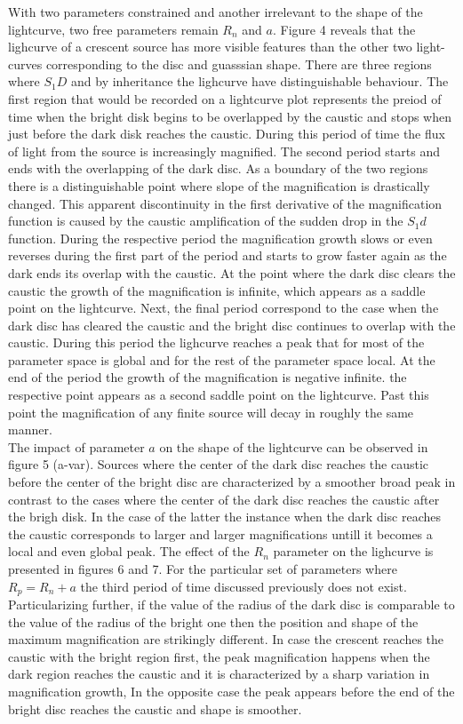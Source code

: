 With two parameters constrained and another irrelevant to the shape of the lightcurve, two free parameters remain $R_n$ and $a$. Figure 4 reveals that the lighcurve of a crescent source has more visible features than the other two light-curves corresponding to the disc and guasssian shape. There are three regions where $S_1D$ and by inheritance the lighcurve have distinguishable behaviour. The first region that would be recorded on a lightcurve plot represents the preiod of time when the bright disk begins to be overlapped by the caustic and stops when just before the dark disk reaches the caustic. During this period of time the flux of light from the source is increasingly magnified. The second period starts and ends with the overlapping of the dark disc. As a boundary of the two regions there is a distinguishable point where slope of the magnification is drastically changed. This apparent discontinuity in the first derivative of the magnification function is caused by the caustic amplification of the sudden drop in the $S_1d$ function. During the respective period the magnification growth slows or even reverses during the first part of the period and starts to grow faster again as the dark ends its overlap with the caustic. At the point where the dark disc clears the caustic the growth of the magnification is infinite, which appears as a saddle point on the lightcurve. Next, the final period correspond to the case when the dark disc has cleared the caustic and the bright disc continues to overlap with the caustic. During this period the lighcurve reaches a peak that for most of the parameter space is global and for the rest of the parameter space local. At the end of the period the growth of the magnification is negative infinite. the respective point appears as a second saddle point on the lightcurve. Past this point the magnification of any finite source will decay in roughly the same manner. \\

The impact of parameter $a$ on the shape of the lightcurve can be observed in figure 5 (a-var). Sources where the center of the dark disc reaches the caustic before the center of the bright disc are characterized by a smoother broad peak in contrast to the cases where the center of the dark disc reaches the caustic after the brigh disk. In the case of the latter the instance when the dark disc reaches the caustic corresponds to larger and larger magnifications untill it becomes a local and even global peak. The effect of the $R_n$  parameter on the lighcurve is presented in figures 6 and 7. For the particular set of parameters where $R_p = R_n +a$ the third period of time discussed previously does not exist. Particularizing further, if the value of the radius of the dark disc is comparable to the value of the radius of the bright one then the position and shape of the maximum magnification are strikingly different. In case the crescent reaches the caustic with the bright region first, the peak magnification happens when the dark region reaches the caustic and it is characterized by a sharp variation in magnification growth, In the opposite case the peak appears before the end of the bright disc reaches the caustic and shape is smoother. \\

